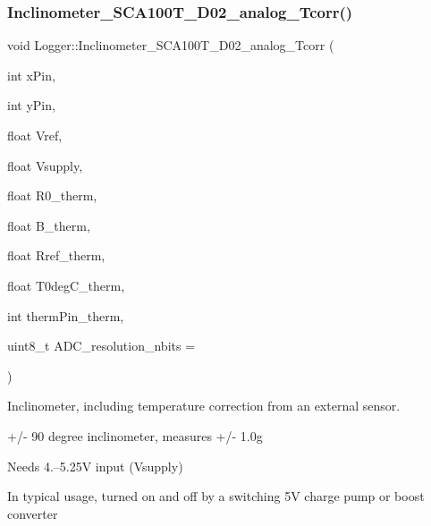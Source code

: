 \subsubsection{\texorpdfstring{Inclinometer\+\_\+\+S\+C\+A100\+T\+\_\+\+D02\+\_\+analog\+\_\+\+Tcorr()}{Inclinometer\_SCA100T\_D02\_analog\_Tcorr()}}
{\footnotesize\ttfamily void Logger\+::\+Inclinometer\+\_\+\+S\+C\+A100\+T\+\_\+\+D02\+\_\+analog\+\_\+\+Tcorr (\begin{DoxyParamCaption}\item[{int}]{x\+Pin,  }\item[{int}]{y\+Pin,  }\item[{float}]{Vref,  }\item[{float}]{Vsupply,  }\item[{float}]{R0\+\_\+therm,  }\item[{float}]{B\+\_\+therm,  }\item[{float}]{Rref\+\_\+therm,  }\item[{float}]{T0deg\+C\+\_\+therm,  }\item[{int}]{therm\+Pin\+\_\+therm,  }\item[{uint8\+\_\+t}]{A\+D\+C\+\_\+resolution\+\_\+nbits = {} }\end{DoxyParamCaption})}

Inclinometer, including temperature correction from an external sensor.


\begin{DoxyItemize}
\item +/-\/ 90 degree inclinometer, measures +/-\/ 1.\+0g
\item Needs 4.--5.\+25V input (Vsupply)
\item In typical usage, turned on and off by a switching 5V charge pump or boost converter
\end{DoxyItemize}


